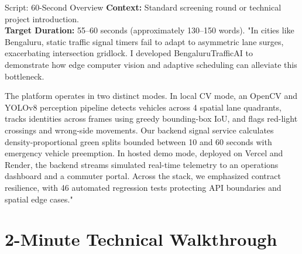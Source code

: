 \begin{interviewq}{Script: 60-Second Overview}
\textbf{Context:} Standard screening round or technical project introduction.\\
\textbf{Target Duration:} 55--60 seconds (approximately 130--150 words).
\tcblower
"In cities like Bengaluru, static traffic signal timers fail to adapt to asymmetric lane surges, exacerbating intersection gridlock. I developed BengaluruTrafficAI to demonstrate how edge computer vision and adaptive scheduling can alleviate this bottleneck.

The platform operates in two distinct modes. In local CV mode, an OpenCV and YOLOv8 perception pipeline detects vehicles across 4 spatial lane quadrants, tracks identities across frames using greedy bounding-box IoU, and flags red-light crossings and wrong-side movements. Our backend signal service calculates density-proportional green splits bounded between 10 and 60 seconds with emergency vehicle preemption. In hosted demo mode, deployed on Vercel and Render, the backend streams simulated real-time telemetry to an operations dashboard and a commuter portal. Across the stack, we emphasized contract resilience, with 46 automated regression tests protecting API boundaries and spatial edge cases."
\end{interviewq}

\section{2-Minute Technical Walkthrough}
\label{sec:script_2min}


